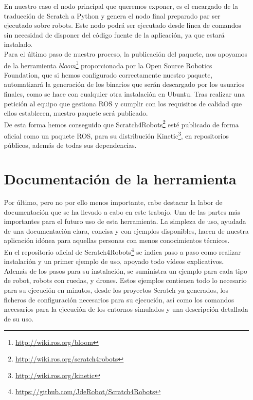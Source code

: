 En nuestro caso el nodo principal que queremos exponer, es el encargado de la traducción de Scratch a Python y genera el nodo final preparado par ser ejecutado sobre robots. Este nodo podrá ser ejecutado desde linea de comandos sin necesidad de disponer del código fuente de la aplicación, ya que estará instalado.\\

Para el último paso de nuestro proceso, la publicación del paquete, nos apoyamos de la herramienta \textit{bloom}\footnote{\url{http://wiki.ros.org/bloom}} proporcionada por la Open Source Robotics Foundation, que si hemos configurado correctamente nuestro paquete, automatizará la generación de los binarios que serán descargado por los usuarios finales, como se hace con cualquier otra instalación en Ubuntu. Tras realizar una petición al equipo que gestiona ROS y cumplir con los requisitos de calidad que ellos establecen, nuestro paquete será publicado.\\ 

De esta forma hemos conseguido que Scratch4Robots\footnote{\url{http://wiki.ros.org/scratch4robots}} esté publicado de forma oficial como un paquete ROS, para su distribución Kinetic\footnote{\url{http://wiki.ros.org/kinetic}}, en repositorios públicos, además de todas sus dependencias. 



\section{Documentación de la herramienta}
\label{sec:documentación}
Por último, pero no por ello menos importante, cabe destacar la labor de documentación que se ha llevado a cabo en este trabajo. Una de las partes más importantes para el futuro uso de esta herramienta. La simpleza de uso, ayudada de una documentación clara, concisa y con ejemplos disponibles, hacen de nuestra aplicación idónea para aquellas personas con menos conocimientos técnicos.\\

En el repositorio oficial de Scratch4Robots\footnote{\url{https://github.com/JdeRobot/Scratch4Robots}} se indica paso a paso como realizar instalación y un primer ejemplo de uso, apoyado todo vídeos explicativos.\\

Además de los pasos para su instalación, se suministra un ejemplo para cada tipo de robot, robots con ruedas, y drones. Estos ejemplos contienen todo lo necesario para su ejecución en minutos, desde los proyectos Scratch ya generados, los ficheros de configuración necesarios para su ejecución, así como los comandos necesarios para la ejecución de los entornos simulados y una descripción detallada de su uso.\\

